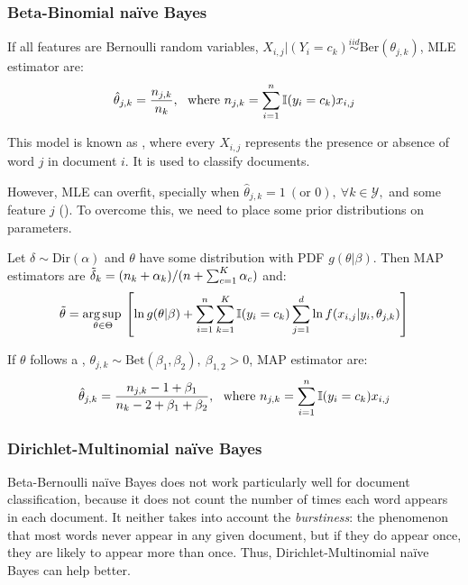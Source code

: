 \subsubsection*{Beta-Binomial naïve Bayes}
If all features are Bernoulli random variables, $X_{i,j}|(Y_i=c_k)\overset{iid}{\sim}\text{Ber}(\theta_{j,k})$, MLE estimator are:
\begin{equation*}
    \hat{\theta}_{j,k} = \frac{n_{j,k}}{n_k},\ \text{ where } n_{j,k}=\sum_{i=1}^n\operatorname{\mathbb{I}}(y_i=c_k)x_{i,j}
\end{equation*}

This model is known as , where every $X_{i,j}$ represents the presence or absence of word $j$ in document $i$. It is used to classify documents. 

However, MLE can overfit, specially when $\hat{\theta}_{j,k}=1\ (\text{or } 0),\ \forall k\in\mathcal{Y},$ and some feature $j$ (). To overcome this, we need to place some prior distributions on parameters. 

Let $\delta\sim\text{Dir}(\alpha)$ and $\theta$ have some distribution with PDF $g(\theta|\beta)$. Then MAP estimators are $\Tilde{\delta}_k = (n_k+\alpha_k)/(n+\sum_{c=1}^K\alpha_c)$ and:
\begin{equation*}
    \Tilde{\theta} = \operatorname*{arg\,sup\,}_{\theta\in\Theta} \left[\ln g(\theta|\beta)+ \sum_{i=1}^n\sum_{k=1}^K\operatorname{\mathbb{I}}(y_i=c_k)\sum_{j=1}^d\ln f(x_{i,j}|y_i,\theta_{j,k})\right]
\end{equation*}

If $\theta$ follows a , $\theta_{j,k}{\sim}\text{Bet}(\beta_1,\beta_2),\ \beta_{1,2}>0$, MAP estimator are:
\begin{equation*}
    \hat{\theta}_{j,k} = \frac{n_{j,k}-1+\beta_1}{n_k-2+\beta_1+\beta_2},\ \text{ where } n_{j,k}=\sum_{i=1}^n\operatorname{\mathbb{I}}(y_i=c_k)x_{i,j}
\end{equation*}

\subsubsection*{Dirichlet-Multinomial naïve Bayes}
Beta-Bernoulli naïve Bayes does not work particularly well for document classification, because it does not count the number of times each word appears in each document. It neither takes into account the \textit{burstiness}: the phenomenon that most words never appear in any given document, but if they do appear once, they are likely to appear more than once. Thus, Dirichlet-Multinomial naïve Bayes can help better.

